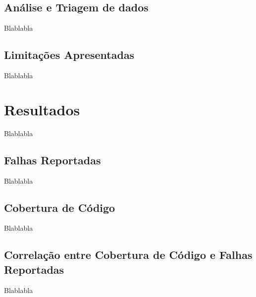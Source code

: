 \documentclass[11.5pt]{article}
\begin{document}
\subsection{Análise e Triagem de dados}
Blablabla


\subsection{Limitações Apresentadas}
Blablabla




\section{Resultados}
Blablabla


\subsection{Falhas Reportadas}
Blablabla


\subsection{Cobertura de Código}
Blablabla


\subsection{Correlação entre Cobertura de Código e Falhas Reportadas}
Blablabla


\end{document}
